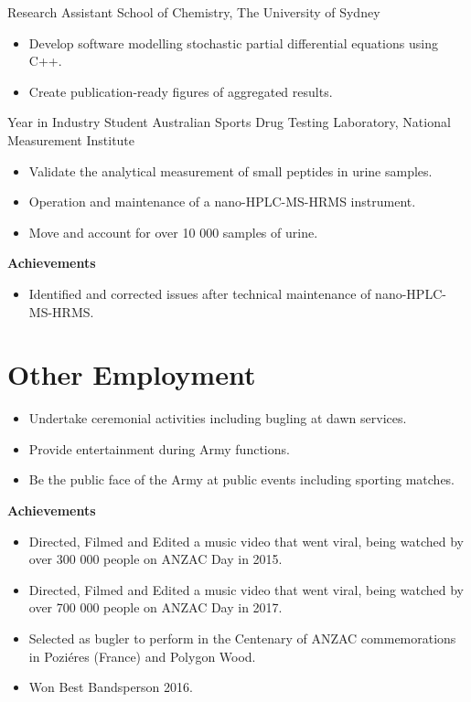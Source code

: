 {Research Assistant}
{School of Chemistry, The University of Sydney}
{}{}{%
  \begin{itemize}
    \item Develop software modelling stochastic partial differential equations using C++.
    \item Create publication-ready figures of aggregated results.
  \end{itemize}
}
\vspace{1em}

{Year in Industry Student}
{Australian Sports Drug Testing Laboratory, National Measurement Institute}
{}{}
{%
  \begin{itemize}
    \item Validate the analytical measurement of small peptides in urine samples.
    \item Operation and maintenance of a nano-HPLC-MS-HRMS instrument.
    \item Move and account for over 10 000 samples of urine.
  \end{itemize}
  \textbf{Achievements}
  \begin{itemize}
    \item Identified and corrected issues after technical maintenance of nano-HPLC-MS-HRMS.
  \end{itemize}
}
\vspace{1em}

\section{Other Employment}

{}{}
{%
\begin{itemize}
  \item Undertake ceremonial activities including bugling at dawn services.
  \item Provide entertainment during Army functions.
  \item Be the public face of the Army at public events including sporting matches.
\end{itemize}
\textbf{Achievements}
\begin{itemize}
  \item Directed, Filmed and Edited a music video  that went viral, being watched by over 300 000 people on ANZAC Day in 2015.
  \item Directed, Filmed and Edited a music video  that went viral, being watched by over 700 000 people on ANZAC Day in 2017.
  \item Selected as bugler to perform in the Centenary of ANZAC commemorations in Poziéres (France) and Polygon Wood.
  \item Won Best Bandsperson 2016.
\end{itemize}
}
\vspace{1em}

